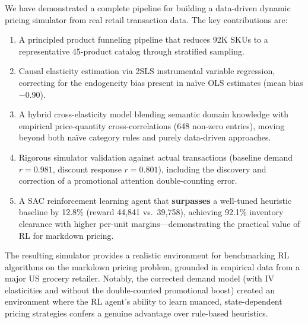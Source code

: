\documentclass[11pt,a4paper]{article}
\begin{document}
We have demonstrated a complete pipeline for building a data-driven dynamic pricing simulator from real retail transaction data.
The key contributions are:
\begin{enumerate}
    \item A principled product funneling pipeline that reduces 92K SKUs to a representative 45-product catalog through stratified sampling.
    \item Causal elasticity estimation via 2SLS instrumental variable regression, correcting for the endogeneity bias present in na\"ive OLS estimates (mean bias $-0.90$).
    \item A hybrid cross-elasticity model blending semantic domain knowledge with empirical price-quantity cross-correlations (648 non-zero entries), moving beyond both na\"ive category rules and purely data-driven approaches.
    \item Rigorous simulator validation against actual transactions (baseline demand $r = 0.981$, discount response $r = 0.801$), including the discovery and correction of a promotional attention double-counting error.
    \item A SAC reinforcement learning agent that \textbf{surpasses} a well-tuned heuristic baseline by 12.8\% (reward 44,841 vs.\ 39,758), achieving 92.1\% inventory clearance with higher per-unit margins---demonstrating the practical value of RL for markdown pricing.
\end{enumerate}

The resulting simulator provides a realistic environment for benchmarking RL algorithms on the markdown pricing problem, grounded in empirical data from a major US grocery retailer.
Notably, the corrected demand model (with IV elasticities and without the double-counted promotional boost) created an environment where the RL agent's ability to learn nuanced, state-dependent pricing strategies confers a genuine advantage over rule-based heuristics.

\end{document}
